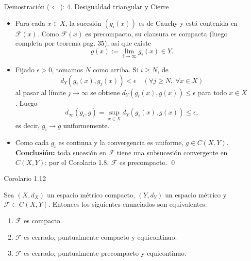 \begin{frame}{Demostración ($\Leftarrow$): 4. Desigualdad triangular y Cierre}
    \begin{itemize}
        \item Para cada $x\in X$, la sucesión $(g_i(x))$ es de Cauchy y está contenida en $\mathcal F(x)$. Como $\mathcal F(x)$ es precompacto, su clausura es compacta (luego completa por teorema pag. 35), así que existe
        \[ g(x):=\lim_{i\to\infty}g_i(x)\in Y. \]
        \item Fijado $\epsilon>0$, tomamos $N$ como arriba. Si $i\ge N$, de
        \[ d_Y(g_i(x),g_j(x))<\epsilon \quad (\forall j\ge N,\ \forall x\in X) \]
        al pasar al límite $j\to\infty$ se obtiene $d_Y(g_i(x),g(x))\le \epsilon$ para todo $x\in X$. Luego
        \[ d_\infty(g_i,g)=\sup_{x\in X}d_Y(g_i(x),g(x))\le\epsilon, \]
        es decir, $g_i\to g$ uniformemente.
        \item Como cada $g_i$ es continua y la convergencia es uniforme, $g\in C(X,Y)$.\\
        \textbf{Conclusión:} toda sucesión en $\mathcal F$ tiene una subsucesión convergente en $C(X,Y)$; por el Corolario 1.8, $\mathcal F$ es precompacto. \qed
    \end{itemize}
\end{frame}

\begin{frame}{Corolario 1.12}
    \begin{corolario}
        Sea $(X, d_X)$ un espacio métrico compacto, $(Y, d_Y)$ un espacio métrico y $\mathcal{F} \subset C(X, Y)$. Entonces los siguientes enunciados son equivalentes:
        \begin{enumerate}
            \item $\mathcal{F}$ es compacto.
            \item $\mathcal{F}$ es cerrado, puntualmente compacto y equicontinuo.
            \item $\mathcal{F}$ es cerrado, puntualmente precompacto y equicontinuo.
        \end{enumerate}
    \end{corolario}
\end{frame}

